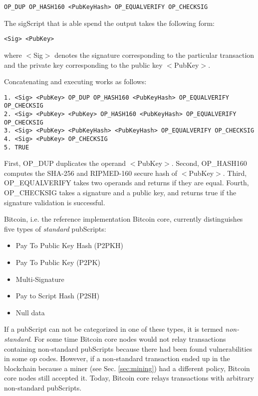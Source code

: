 \begin{lstlisting}
OP_DUP OP_HASH160 <PubKeyHash> OP_EQUALVERIFY OP_CHECKSIG
\end{lstlisting}

The sigScript that is able spend the output takes the following form:

\begin{lstlisting}
<Sig> <PubKey>
\end{lstlisting}

where $<$Sig$>$ denotes the signature corresponding to the particular transaction and the private key corresponding to the public key $<$PubKey$>$.

Concatenating and executing works as follows:

\begin{lstlisting}[breaklines]
1. <Sig> <PubKey> OP_DUP OP_HASH160 <PubKeyHash> OP_EQUALVERIFY OP_CHECKSIG
2. <Sig> <PubKey> <PubKey> OP_HASH160 <PubKeyHash> OP_EQUALVERIFY OP_CHECKSIG
3. <Sig> <PubKey> <PubKeyHash> <PubKeyHash> OP_EQUALVERIFY OP_CHECKSIG
4. <Sig> <PubKey> OP_CHECKSIG
5. TRUE
\end{lstlisting}

First, OP\_DUP duplicates the operand $<$PubKey$>$. Second, OP\_HASH160 computes the SHA-256 and RIPMED-160 secure hash of $<$PubKey$>$. Third, OP\_EQUALVERIFY takes two operands and returns if they are equal. Fourth, OP\_CHECKSIG takes a signature and a public key, and returns true if the signature validation is successful. 

Bitcoin, i.e. the reference implementation Bitcoin core, currently distinguishes five types of \emph{standard} pubScripts:

\begin{itemize}
\item Pay To Public Key Hash (P2PKH)
\item Pay To Public Key (P2PK)
\item Multi-Signature 
\item Pay to Script Hash (P2SH)
\item Null data
\end{itemize}

If a pubScript can not be categorized in one of these types, it is termed \emph{non-standard}. For some time Bitcoin core nodes would not relay transactions containing non-standard pubScripts because there had been found vulnerabilities in some op codes. However, if a non-standard transaction ended up in the blockchain because a miner  (see Sec. \ref{sec:mining}) had a different policy, Bitcoin core nodes still accepted it. Today, Bitcoin core relays transactions with arbitrary non-standard pubScripts.

